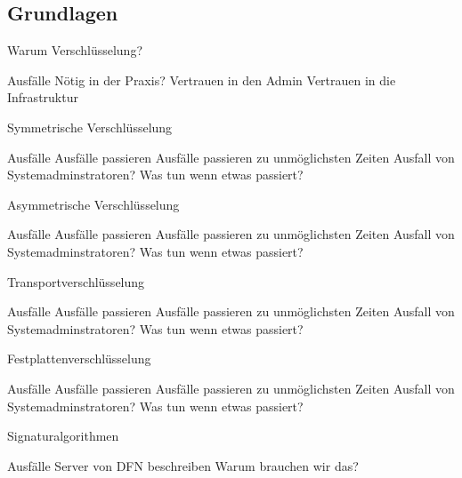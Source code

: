 \documentclass[10pt]{beamer}
\begin{document}
\subsection{Grundlagen}

\begin{frame}[fragile]{Warum Verschlüsselung?}
\begin{alertblock}{Ausfälle}
Nötig in der Praxis?
Vertrauen in den Admin
Vertrauen in die Infrastruktur
\end{alertblock}
\end{frame}

\begin{frame}[fragile]{Symmetrische Verschlüsselung}
\begin{alertblock}{Ausfälle}
	Ausfälle passieren
	Ausfälle passieren zu unmöglichsten Zeiten
	Ausfall von Systemadminstratoren?
	Was tun wenn etwas passiert?
\end{alertblock}
\end{frame}

\begin{frame}[fragile]{Asymmetrische Verschlüsselung}
\begin{alertblock}{Ausfälle}
	Ausfälle passieren
	Ausfälle passieren zu unmöglichsten Zeiten
	Ausfall von Systemadminstratoren?
	Was tun wenn etwas passiert?
\end{alertblock}
\end{frame}

\begin{frame}[fragile]{Transportverschlüsselung}
\begin{alertblock}{Ausfälle}
	Ausfälle passieren
	Ausfälle passieren zu unmöglichsten Zeiten
	Ausfall von Systemadminstratoren?
	Was tun wenn etwas passiert?
\end{alertblock}
\end{frame}

\begin{frame}[fragile]{Festplattenverschlüsselung}
\begin{alertblock}{Ausfälle}
	Ausfälle passieren
	Ausfälle passieren zu unmöglichsten Zeiten
	Ausfall von Systemadminstratoren?
	Was tun wenn etwas passiert?
\end{alertblock}
\end{frame}

\begin{frame}[fragile]{Signaturalgorithmen}
\begin{alertblock}{Ausfälle}
Server von DFN beschreiben
Warum brauchen wir das?
\end{alertblock}
\end{frame}
\end{document}
